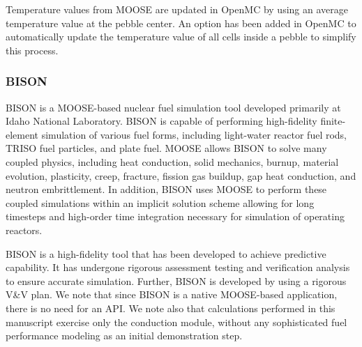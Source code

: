 Temperature values from MOOSE are updated in OpenMC by using an average temperature value at the pebble center. An option has been added in OpenMC to automatically update the temperature value of all cells inside a pebble to simplify this process.

\subsubsection{BISON}

BISON is a MOOSE-based \cite{hales2013triso, williamson2012multidimensional} nuclear fuel simulation tool developed primarily at Idaho National Laboratory.
BISON is capable of performing high-fidelity finite-element simulation of various fuel forms, including
light-water reactor fuel rods, TRISO fuel particles, and plate fuel. MOOSE allows BISON to solve many
coupled physics, including heat conduction, solid mechanics, burnup, material evolution, plasticity, creep,
fracture, fission gas buildup, gap heat conduction, and neutron embrittlement. In addition, BISON uses
MOOSE to perform these coupled simulations within an implicit solution scheme allowing for long timesteps
and high-order time integration necessary for simulation of operating reactors.

BISON is a high-fidelity tool that has been developed to achieve predictive capability. It has undergone
rigorous assessment testing and verification analysis to ensure accurate simulation. Further, BISON is
developed by using a rigorous V\&V plan. We note that since BISON is a native MOOSE-based application, there is no need for an API. We note also that calculations performed in this manuscript exercise only the conduction module, without any sophisticated fuel performance modeling as an initial demonstration step.
